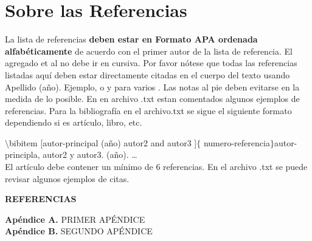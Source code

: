 \documentclass[10.5 pt, twocolumn]{article}
\begin{document}
\section{Sobre las Referencias}
La lista de referencias \textbf {deben estar en Formato APA ordenada alfabéticamente} de acuerdo con el primer autor de la lista de referencia. El agregado et al no debe ir en cursiva. Por favor nótese que todas las referencias listadas aquí deben estar directamente citadas en el cuerpo del texto usando Apellido (año). Ejemplo, \cite{chen1990linear} o \cite{trevino2016managing} y para varios \cite{Falconi2020, duchesne2018educational, sainaghi2008strategic, harrison2005development}. Las notas al pie deben evitarse en la medida de lo posible. En en archivo .txt estan comentados algunos ejemplos de referencias. Para la bibliografía en el archivo.txt se sigue el siguiente formato dependiendo si es artículo, libro, etc.

$\setminus$bibitem [autor-principal  (año) autor2 and autor3 ]$\lbrace$ numero-referencia$\rbrace$autor-principla, autor2 y autor3. (año). \dots \\

El artículo debe contener un mínimo de 6 referencias. En el archivo .txt se puede revisar algunos ejemplos de citas. 

\begin{center}
\bf REFERENCIAS
\end{center}
\printbibliography[title={Referencias}, heading=none]


{\bf Apéndice A.}  PRIMER APÉNDICE \\

{\bf Apéndice B.} SEGUNDO APÉNDICE \\
\end{document}
